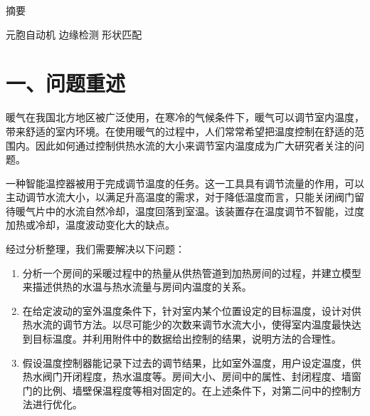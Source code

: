 \documentclass{my_paper}
\begin{document}
\newpage
\begin{center}
\lunwenbiaoti

\vspace{2ex}
\zhaiyao
\end{center}

摘要

\begin{guanjianci}
 元胞自动机 \quad 边缘检测 \quad 形状匹配
\end{guanjianci}

\newpage
\section{一、问题重述}

暖气在我国北方地区被广泛使用，在寒冷的气候条件下，暖气可以调节室内温度，带来舒适的室内环境。在使用暖气的过程中，人们常常希望把温度控制在舒适的范围内。因此如何通过控制供热水流的大小来调节室内温度成为广大研究者关注的问题。

一种智能温控器被用于完成调节温度的任务。这一工具具有调节流量的作用，可以主动调节水流大小，以满足升高温度的需求，对于降低温度而言，只能关闭阀门留待暖气片中的水流自然冷却，温度回落到室温。该装置存在温度调节不智能，过度加热或冷却，温度波动变化大的缺点。

经过分析整理，我们需要解决以下问题：
\begin{enumerate}
    \item 分析一个房间的采暖过程中的热量从供热管道到加热房间的过程，并建立模型来描述供热的水温与热水流量与房间内温度的关系。
    \item 在给定波动的室外温度条件下，针对室内某个位置设定的目标温度，设计对供热水流的调节方法。以尽可能少的次数来调节水流大小，使得室内温度最快达到目标温度。并利用附件中的数据给出控制的结果，说明方法的合理性。
    \item 假设温度控制器能记录下过去的调节结果，比如室外温度，用户设定温度，供热水阀门开闭程度，热水温度等。房间大小、房间中的属性、封闭程度、墙窗门的比例、墙壁保温程度等相对固定的。在上述条件下，对第二问中的控制方法进行优化。
\end{enumerate}
\end{document}
